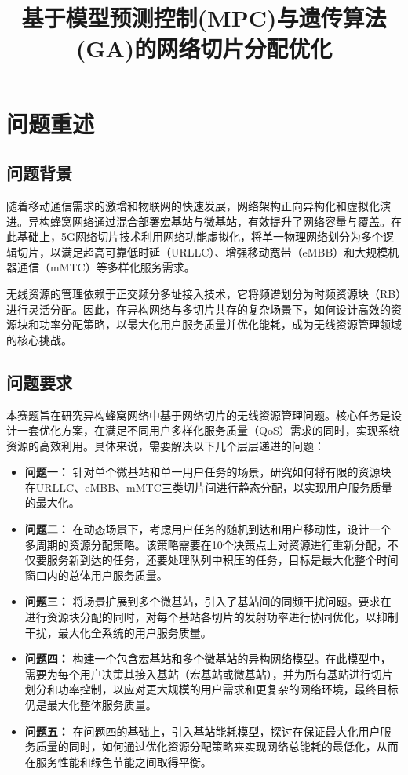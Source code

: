 \documentclass[withoutpreface,bwprint]{cumcmthesis}
\title{基于模型预测控制(MPC)与遗传算法(GA)的网络切片分配优化}  %
\begin{document}
\maketitle


\tableofcontents  %
\newpage

\section{问题重述}
\subsection{问题背景}
随着移动通信需求的激增和物联网的快速发展，网络架构正向异构化和虚拟化演进。异构蜂窝网络通过混合部署宏基站与微基站，有效提升了网络容量与覆盖。在此基础上，5G网络切片技术利用网络功能虚拟化，将单一物理网络划分为多个逻辑切片，以满足超高可靠低时延（URLLC）、增强移动宽带（eMBB）和大规模机器通信（mMTC）等多样化服务需求。

无线资源的管理依赖于正交频分多址接入技术，它将频谱划分为时频资源块（RB）进行灵活分配。因此，在异构网络与多切片共存的复杂场景下，如何设计高效的资源块和功率分配策略，以最大化用户服务质量并优化能耗，成为无线资源管理领域的核心挑战。

\subsection{问题要求}
本赛题旨在研究异构蜂窝网络中基于网络切片的无线资源管理问题。核心任务是设计一套优化方案，在满足不同用户多样化服务质量（QoS）需求的同时，实现系统资源的高效利用。具体来说，需要解决以下几个层层递进的问题：

\begin{itemize}
    \item \textbf{问题一：} 针对单个微基站和单一用户任务的场景，研究如何将有限的资源块在URLLC、eMBB、mMTC三类切片间进行静态分配，以实现用户服务质量的最大化。
    \item \textbf{问题二：} 在动态场景下，考虑用户任务的随机到达和用户移动性，设计一个多周期的资源分配策略。该策略需要在10个决策点上对资源进行重新分配，不仅要服务新到达的任务，还要处理队列中积压的任务，目标是最大化整个时间窗口内的总体用户服务质量。
    \item \textbf{问题三：} 将场景扩展到多个微基站，引入了基站间的同频干扰问题。要求在进行资源块分配的同时，对每个基站各切片的发射功率进行协同优化，以抑制干扰，最大化全系统的用户服务质量。
    \item \textbf{问题四：} 构建一个包含宏基站和多个微基站的异构网络模型。在此模型中，需要为每个用户决策其接入基站（宏基站或微基站），并为所有基站进行切片划分和功率控制，以应对更大规模的用户需求和更复杂的网络环境，最终目标仍是最大化整体服务质量。
    \item \textbf{问题五：} 在问题四的基础上，引入基站能耗模型，探讨在保证最大化用户服务质量的同时，如何通过优化资源分配策略来实现网络总能耗的最低化，从而在服务性能和绿色节能之间取得平衡。
\end{itemize}
\end{document}
